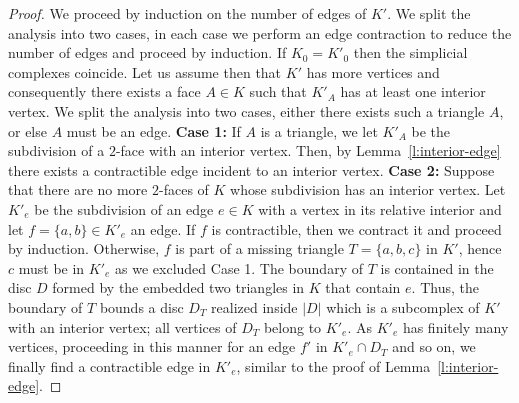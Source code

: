 \documentclass[11pt]{article}
\numberwithin{claimcounter}{theorem}
\theoremstyle{remark}
\theoremstyle{definition}
\numberwithin{theorem}{section}
\begin{document}
\begin{proof}
   We proceed by induction on the number of edges of $K'$.
   We split the analysis into two cases, in each case we perform an edge contraction to reduce the number of edges and proceed by induction.
   If $K_0=K'_0$ then the simplicial complexes coincide. Let us assume then that $K'$ has more vertices and consequently there exists a face $A\in K$ such that $K'_A$ has at least one interior vertex. We split the analysis into two cases, either there exists such a triangle $A$, or else $A$ must be an edge.
%
   \noindent
   {\bf Case 1:} If $A$ is a triangle, we let $K'_A$ be the subdivision of a $2$-face with an interior vertex. Then, by Lemma~\ref{l:interior-edge} there exists a contractible edge incident to an interior vertex.
%
   \noindent
   {\bf Case 2:}  Suppose
    that there are no more $2$-faces of $K$ whose subdivision has an interior vertex. Let $K'_e$ be the subdivision of an edge $e\in K$ with a vertex in its relative interior and let $f=\{a,b\}\in K'_e$ an edge. If $f$ is contractible, then we contract it and proceed by induction. Otherwise, $f$ is part of a missing triangle $T=\{a,b,c\}$ in $K'$, hence $c$ must be in $K'_e$ as we excluded Case 1.
%
   The boundary of $T$ is contained in the disc $D$ formed by the embedded two triangles in $K$ that contain $e$. Thus, the boundary of $T$ bounds a disc $D_T$ realized inside $|D|$ which is a subcomplex of $K'$ with an interior vertex; all vertices of $D_T$ belong to $K'_e$.
   As $K'_e$ has finitely many vertices, proceeding in this manner for an edge $f'$ in $K'_e\cap D_T$ and so on, we finally find a contractible edge in $K'_e$,
similar to the proof of Lemma~\ref{l:interior-edge}.
\end{proof}
%
%
\end{document}
